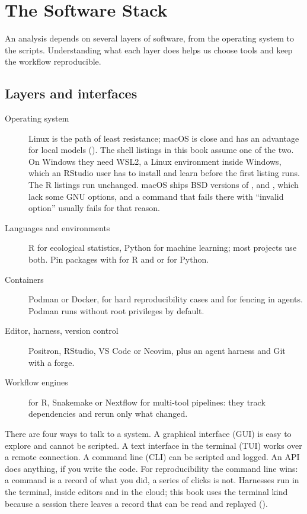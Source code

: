 \chapter{The Software Stack}
\label{ch:stack}

An analysis depends on several layers of software, from the operating system
to the scripts. Understanding what each layer does helps us choose tools and
keep the workflow reproducible.

\section{Layers and interfaces}

\begin{description}
  \item[Operating system] Linux is the path of least resistance; macOS is close
    and has an advantage for local models (). The shell
    listings in this book assume one of the two. On Windows they need WSL2, a
    Linux environment inside Windows, which an RStudio user has to install and
    learn before the first listing runs. The R listings run unchanged. macOS
    ships BSD versions of ,  and , which lack
    some GNU options, and a command that fails there with ``invalid option''
    usually fails for that reason.
  \item[Languages and environments] R for ecological statistics, Python for
    machine learning; most projects use both. Pin packages with 
    for R and  or  for Python.
  \item[Containers] Podman or Docker, for hard reproducibility cases and for
    fencing in agents. Podman runs without root privileges by default.
  \item[Editor, harness, version control] Positron, RStudio, VS Code or Neovim,
    plus an agent harness and Git with a forge.
  \item[Workflow engines]  for R, Snakemake or Nextflow for
    multi-tool pipelines: they track dependencies and rerun only what changed.
\end{description}

There are four ways to talk to a system. A graphical interface (GUI) is easy to
explore and cannot be scripted. A text interface in the terminal (TUI) works
over a remote connection. A command line (CLI) can be scripted and logged. An
API does anything, if you write the code. For reproducibility the command line
wins: a command is a record of what you did, a series of clicks is not.
Harnesses run in the terminal, inside editors and in the cloud; this book
uses the terminal kind because a session there leaves a record that can be
read and replayed ().

